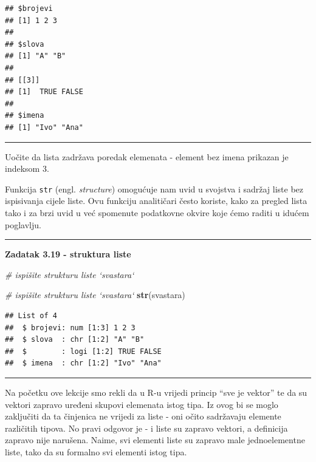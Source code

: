 \documentclass[]{book}
\newenvironment{Shaded}{\begin{snugshade}}{\end{snugshade}}
\newcommand{\KeywordTok}[1]{\textcolor[rgb]{0.13,0.29,0.53}{\textbf{#1}}}
\newcommand{\CommentTok}[1]{\textcolor[rgb]{0.56,0.35,0.01}{\textit{#1}}}
\newcommand{\NormalTok}[1]{#1}
\theoremstyle{definition}
\theoremstyle{definition}
\theoremstyle{definition}
\theoremstyle{remark}
\begin{document}
\begin{verbatim}
## $brojevi
## [1] 1 2 3
## 
## $slova
## [1] "A" "B"
## 
## [[3]]
## [1]  TRUE FALSE
## 
## $imena
## [1] "Ivo" "Ana"
\end{verbatim}

\begin{center}\rule{0.5\linewidth}{\linethickness}\end{center}

Uočite da lista zadržava poredak elemenata - element bez imena prikazan
je indeksom 3.

Funkcija \texttt{str} (engl. \emph{structure}) omogućuje nam uvid u
svojstva i sadržaj liste bez ispisivanja cijele liste. Ovu funkciju
analitičari često koriste, kako za pregled lista tako i za brzi uvid u
već spomenute podatkovne okvire koje ćemo raditi u idućem poglavlju.

\begin{center}\rule{0.5\linewidth}{\linethickness}\end{center}

\textbf{Zadatak 3.19 - struktura liste}

\begin{Shaded}
\begin{Highlighting}[]
\CommentTok{# ispišite strukturu liste `svastara`}
\end{Highlighting}
\end{Shaded}

\begin{Shaded}
\begin{Highlighting}[]
\CommentTok{# ispišite strukturu liste `svastara`}
\KeywordTok{str}\NormalTok{(svastara)}
\end{Highlighting}
\end{Shaded}

\begin{verbatim}
## List of 4
##  $ brojevi: num [1:3] 1 2 3
##  $ slova  : chr [1:2] "A" "B"
##  $        : logi [1:2] TRUE FALSE
##  $ imena  : chr [1:2] "Ivo" "Ana"
\end{verbatim}

\begin{center}\rule{0.5\linewidth}{\linethickness}\end{center}

Na početku ove lekcije smo rekli da u R-u vrijedi princip ``sve je
vektor'' te da su vektori zapravo uređeni skupovi elemenata istog tipa.
Iz ovog bi se moglo zaključiti da ta činjenica ne vrijedi za liste - oni
očito sadržavaju elemente različitih tipova. No pravi odgovor je - i
liste su zapravo vektori, a definicija zapravo nije narušena. Naime, svi
elementi liste su zapravo male jednoelementne liste, tako da su formalno
svi elementi istog tipa.
\end{document}
